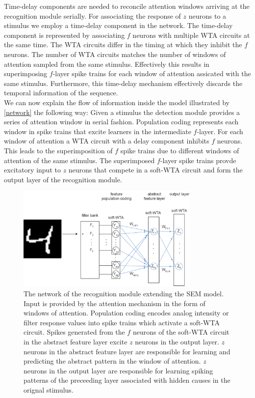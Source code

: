 \documentclass{report}
\begin{document}
Time-delay components are needed to reconcile attention windows arriving at the recognition module serially. For associating the response of $z$ neurons to a stimulus we employ a time-delay component in the network. The time-delay component is represented by associating $f$ neurons with multiple WTA circuits at the same time. The WTA circuits differ in the timing at which they inhibit the $f$ neurons. The number of WTA circuits matches the number of windows of attention sampled from the same stimulus. Effectively this results in superimposing $f$-layer spike trains for each window of attention assicated with the same stimulus. Furthermore, this time-delay mechanism effectively discards the temporal information of the sequence.\\

We can now explain the flow of information inside the model illustrated by \cref{network} the following way: Given a stimulus the detection module provides a series of attention window in serial fashion. Population coding represents each window in spike trains that excite learners in the intermediate $f$-layer. For each window of attention a WTA circuit with a delay component inhibits $f$ neurons. This leads to the superimposition of $f$ spike trains due to different windows of attention of the same stimulus. The superimposed $f$-layer spike trains provde excitatory input to $z$ neurons that compete in a soft-WTA circuit and form the output layer of the recognition module.

\begin{figure}[ht]
\centering
\includegraphics[width=0.8\textwidth]{network}
\caption{The network of the recognition module extending the SEM model. Input is provided by the attention mechanism in the form of windows of attention. Population coding encodes analog intensity or filter response values into spike trains which activate a soft-WTA circuit. Spikes generated from the $f$ neurons of the soft-WTA circuit in the abstract feature layer excite $z$ neurons in the output layer. $z$ neurons in the abstract feature layer are responsible for learning and predicting the abstract pattern in the window of attention. $z$ neurons in the output layer are responsible for learning spiking patterns of the preceeding layer associated with hidden causes in the orignal stimulus.
\label{fig:network}}
\end{figure}
\end{document}
